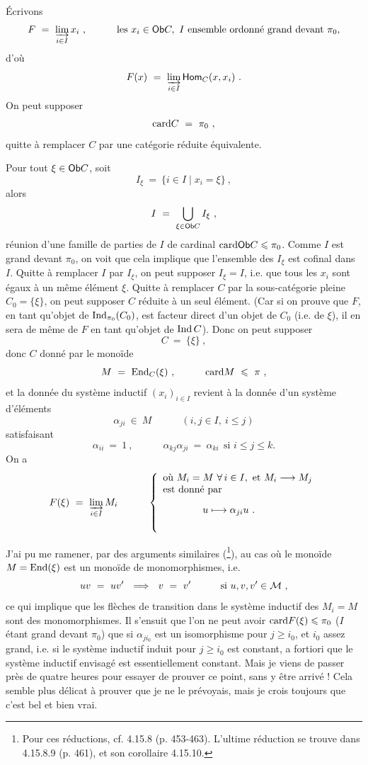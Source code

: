 Écrivons
\[
F \ = \ \varinjlim_{i\in I} x_i\ , \qquad\quad \text{les } x_i \in \mathsf{Ob} C,\ I \text{ ensemble ordonné grand devant } \pi_0,
\]
d'où
\[
F(x) \ = \ \varinjlim_{i\in I} \Hom_C(x, x_i)\ .
\]
On peut supposer
\[
\mathrm{card} C \ = \ \pi_0\ ,
\]
quitte à remplacer $C$ par une catégorie réduite équivalente.

Pour tout $\xi \in \mathsf{Ob} C$, soit
\[
I_{\xi} \ = \ \{ i \in I \mid x_i = \xi \}\ ,
\]
alors
\[
I \ = \ \bigcup_{\xi\in\mathsf{Ob} C} I_{\xi}\ ,
\]
réunion d'une famille de parties de $I$ de cardinal $\mathrm{card}\mathsf{Ob} C \leqslant \pi_0$. Comme $I$ est grand devant $\pi_0$, on voit que cela implique que l'ensemble des $I_{\xi}$ est cofinal dans $I$. Quitte à remplacer $I$ par $I_{\xi}$, on peut supposer $I_{\xi} = I$, i.e. que tous les $x_i$ sont égaux à un même élément $\xi$. Quitte à remplacer $C$ par la sous-catégorie pleine $C_0 = \{\xi\}$, on peut supposer $C$ réduite à un seul élément. (Car si on prouve que $F$, en tant qu'objet de $\operatorname{Ind}_{\pi_0}(C_0)$, est facteur direct d'un objet de $C_0$ (i.e. de $\xi$), il en sera de même de $F$ en tant qu'objet de $\operatorname{Ind} C$). Donc on peut supposer
\[
C \ = \ \{\xi\}\ ,
\]
donc $C$ donné par le monoïde
\[
M \ = \ \operatorname{End}_C(\xi)\ , \qquad\quad \mathrm{card} M \ \leqslant\ \pi\ ,
\]
et la donnée du système inductif $(x_i)_{i\in I}$ revient à la donnée d'un système d'éléments
\[
\alpha_{ji} \ \in\ M \qquad\quad (i, j \in I,\ i \leqslant j)
\]
satisfaisant
\[
\alpha_{ii} \ = \ 1\ , \qquad\quad \alpha_{kj}\alpha_{ji} \ = \ \alpha_{ki} \ \ \text{si } i \leqslant j \leqslant k.
\]
On a
\[
F(\xi) \ = \ \varinjlim_{i\in I} M_i \qquad\quad
\left\{
\begin{array}{l}
\text{où } M_i = M \ \forall\, i \in I, \text{ et } M_i \longrightarrow M_j \\
\text{est donné par} \\[2ex]
\qquad\qquad u \longmapsto \alpha_{ji}u\ . \\[4ex]
\end{array}
\right.
\]


J'ai pu me ramener, par des arguments similaires (\footnote[92]{Pour ces réductions, cf. 4.15.8 (p. 453-463). L'ultime réduction se trouve dans 4.15.8.9 (p. 461), et son corollaire 4.15.10.}), au cas où le monoïde $M = \operatorname{End}(\xi)$ est un monoïde de monomorphismes, i.e.
\[
uv \ = \ uv' \ \ \Longrightarrow\ \ v \ = \ v' \qquad\quad \text{si } u, v, v' \in \cM\ ,
\] %
ce qui implique que les flèches de transition dans le système inductif des $M_i = M$ sont des monomorphismes. Il s'ensuit que l'on ne peut avoir $\mathrm{card} F(\xi) \leqslant \pi_0$ ($I$ étant grand devant $\pi_0$) que si $\alpha_{ji_0}$ est un isomorphisme pour $j \geqslant i_0$, et $i_0$ assez grand, i.e. si le système inductif induit pour $j \geqslant i_0$ est constant, a fortiori que le système inductif envisagé est essentiellement constant. Mais je viens de passer près de quatre heures pour essayer de prouver ce point, sans y être arrivé ! Cela semble plus délicat à prouver que je ne le prévoyais, mais je crois toujours que c'est bel et bien vrai.

